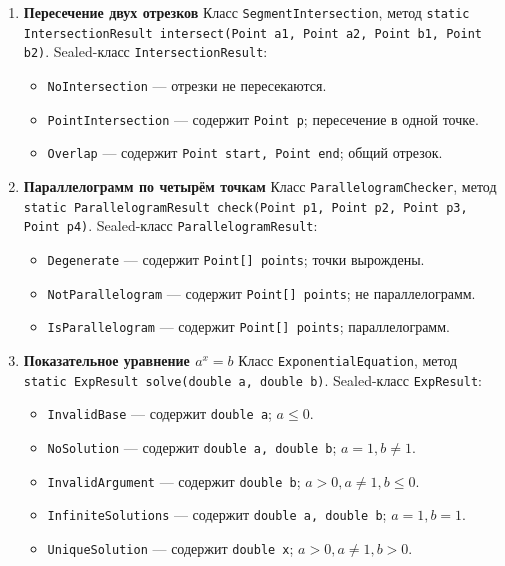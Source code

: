\documentclass[12pt]{article}
\begin{document}
\begin{enumerate}
\item[22] \textbf{Пересечение двух отрезков}
Класс \texttt{SegmentIntersection}, метод
\texttt{static IntersectionResult intersect(Point a1, Point a2, Point b1, Point b2)}.
Sealed-класс \texttt{IntersectionResult}:
\begin{itemize}
\item \texttt{NoIntersection} — отрезки не пересекаются.
\item \texttt{PointIntersection} — содержит \texttt{Point p}; пересечение в одной точке.
\item \texttt{Overlap} — содержит \texttt{Point start, Point end}; общий отрезок.
\end{itemize}

\item[23] \textbf{Параллелограмм по четырём точкам}
Класс \texttt{ParallelogramChecker}, метод
\texttt{static ParallelogramResult check(Point p1, Point p2, Point p3, Point p4)}.
Sealed-класс \texttt{ParallelogramResult}:
\begin{itemize}
\item \texttt{Degenerate} — содержит \texttt{Point[] points}; точки вырождены.
\item \texttt{NotParallelogram} — содержит \texttt{Point[] points}; не параллелограмм.
\item \texttt{IsParallelogram} — содержит \texttt{Point[] points}; параллелограмм.
\end{itemize}

\item[24] \textbf{Показательное уравнение \(a^x = b\)}
Класс \texttt{ExponentialEquation}, метод
\texttt{static ExpResult solve(double a, double b)}.
Sealed-класс \texttt{ExpResult}:
\begin{itemize}
\item \texttt{InvalidBase} — содержит \texttt{double a}; \(a \leq 0\).
\item \texttt{NoSolution} — содержит \texttt{double a, double b}; \(a = 1, b \neq 1\).
\item \texttt{InvalidArgument} — содержит \texttt{double b}; \(a > 0, a \neq 1, b \leq 0\).
\item \texttt{InfiniteSolutions} — содержит \texttt{double a, double b}; \(a = 1, b = 1\).
\item \texttt{UniqueSolution} — содержит \texttt{double x}; \(a > 0, a \neq 1, b > 0\).
\end{itemize}


\end{enumerate}
\end{document}
